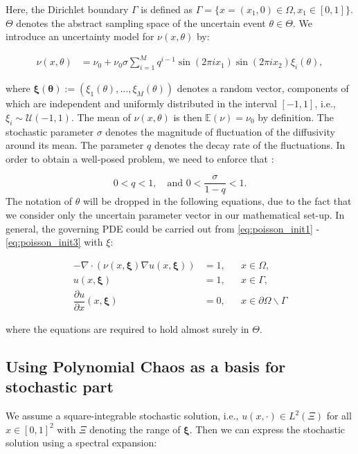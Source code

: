 \documentclass{article}
\begin{document}
Here, the Dirichlet boundary $\Gamma$ is defined as $\Gamma = \{ x = (x_{1}, 0) \in \Omega, x_1 \in [0,1] \} $.  $\Theta$ denotes the abstract sampling space of the uncertain event $\theta \in \Theta$. We introduce an uncertainty model for $\nu(x,\theta)$ by:

\begin{align}
\label{eq:uncertain}
\nu(x,\theta) &= \nu_0 + \nu_0 \sigma \sum_{i=1}^M q^{i-1}\sin(2\pi ix_1)\sin(2\pi ix_2)\xi_i(\theta),
\end{align}

where $\bm{\xi(\theta)} := (\xi_1(\theta),\ldots,\xi_M(\theta))$ denotes a random vector, components of which are independent and uniformly distributed in the interval $[-1,1]$, i.e., $\xi_i \sim \mathcal{U}(-1,1)$. The mean of $\nu(x,\theta)$ is then $\mathbb{E}(\nu) = \nu_0$ by definition. The stochastic parameter $\sigma$ denotes the magnitude of fluctuation of the diffusivity around its mean. The parameter $q$ denotes the decay rate of the fluctuations. In order to obtain a well-posed problem, we need to enforce that :

\begin{equation*}
0 < q < 1,\quad\text{and } 0 < \dfrac{\sigma}{1-q} < 1.
\end{equation*}
The notation of $\theta$ will be dropped in the following equations, due to the fact that we consider only the uncertain parameter vector \bm{$\xi$} in our mathematical set-up. In general, the governing PDE could be carried out from \eqref{eq:poisson_init1} - \eqref{eq:poisson_init3} with $\xi$:

\begin{align}
\label{eq:poisson}
-\nabla \cdot (\nu(x, \bm{\xi}) \nabla u(x, \bm{\xi})) &= 1, &&x \in \Omega, \\
u(x, \bm{\xi}) &= 1, &&x \in \Gamma, \\
\dfrac{\partial u}{\partial x}(x, \bm{\xi}) &= 0, &&x \in \partial \Omega \backslash \Gamma
\end{align}

where the equations are required to hold almost surely in $\Theta$.

\subsection{Using Polynomial Chaos as a basis for stochastic part}

We assume a square-integrable stochastic solution, i.e., $u(x,\cdot) \in L^2(\Xi)$ for all $x \in [0,1]^2$ with $\Xi$ denoting the range of $\bm{\xi}$. Then we can express the stochastic solution using a spectral expansion:
\end{document}

